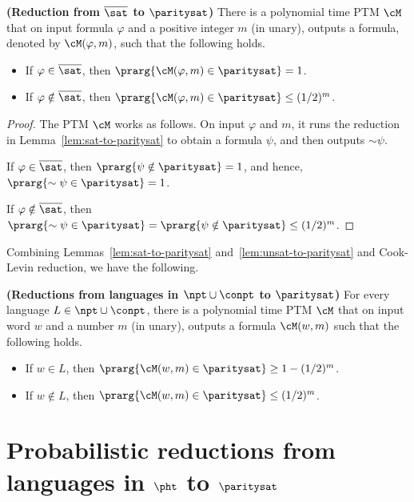 \documentclass[11pt, a4paper]{article}
\begin{document}
\begin{lemma}
\label{lem:unsat-to-paritysat}
{\bf (Reduction from $\overline{\sat}$ to $\paritysat$)}
There is a polynomial time PTM $\cM$ 
that on input formula $\varphi$ and a positive integer $m$ (in unary), 
outputs a formula, denoted by $\cM(\varphi,m)$, such that the following holds.
\begin{itemize}
\item
If $\varphi \in \overline{\sat}$, then $\prarg {\cM(\varphi,m)\in\paritysat} =1$.
\item
If $\varphi\notin \overline{\sat}$, then $\prarg {\cM(\varphi,m)\in \paritysat} \leq (1/2)^m$.
\end{itemize}
\end{lemma}
\begin{proof}
The PTM $\cM$ works as follows.
On input $\varphi$ and $m$, it runs the reduction in Lemma~\ref{lem:sat-to-paritysat} to obtain a formula $\psi$,
and then outputs $\sim \psi$.

If $\varphi \in \overline{\sat}$, then $\prarg {\psi \notin \paritysat} = 1$, and hence,
$\prarg{\sim\psi \in \paritysat}=1$.

If $\varphi \notin \overline{\sat}$, then $\prarg {\sim \psi \in \paritysat} = \prarg {\psi \notin \paritysat} \leq (1/2)^m$.
\end{proof}

Combining Lemmas~\ref{lem:sat-to-paritysat} and~\ref{lem:unsat-to-paritysat}
and Cook-Levin reduction, 
we have the following.

\begin{theorem}
\label{theo:np-conp-to-paritysat}
{\bf (Reductions from languages in $\npt\cup\conpt$ to $\paritysat$)}
For every language $L\in \npt\cup\conpt$,
there is a polynomial time PTM $\cM$ 
that on input word $w$ and a number $m$ (in unary), 
outputs a formula $\cM(w,m)$ such that the following holds.
\begin{itemize}
\item
If $w\in L$, then $\prarg {\cM(w,m)\in\paritysat} \geq 1-(1/2)^m$.
\item
If $w\notin L$, then $\prarg {\cM(w,m)\in \paritysat} \leq (1/2)^m$.
\end{itemize}
\end{theorem}


\section{Probabilistic reductions from languages in $\pht$ to $\paritysat$}
\end{document}
